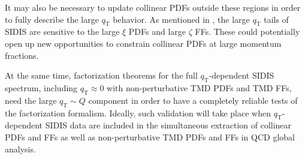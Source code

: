 \documentclass[prd,preprintnumbers,nofootinbib,superscriptaddress,onecolumn,preprint]{revtex4-1}
\newcommand\3[1]{\boldsymbol{#1}}
\newcommand{\Tsc}[2]{#1_{#2\text{T}}}
\begin{document}
It may also be necessary to update collinear PDFs outside these regions in 
order to fully describe the large $\Tsc{q}{}$ behavior. 
As mentioned in \cite{Gonzalez-Hernandez:2018ipj}, the large
$\Tsc{q}{}$ tails of SIDIS are sensitive to the large $\xi$ PDFs and
large $\zeta$ FFs. These could potentially open up new opportunities to constrain 
collinear PDFs at large momentum fractions.  

At the same time, factorization theorems for the full $\Tsc{q}{}$-dependent SIDIS 
spectrum, including $\Tsc{q}{} \approx 0$ with non-perturbative TMD PDFs and TMD 
FFs, need the large $\Tsc{q}{} \sim Q$ component in order to have a completely reliable 
tests of the factorization formalism. 
Ideally, such validation will take place when $\Tsc{q}{}$-dependent
SIDIS data are included in the simultaneous extraction of collinear PDFs and FFs
as well as non-perturbative TMD PDFs and FFs in QCD global analysis. 
\end{document}

